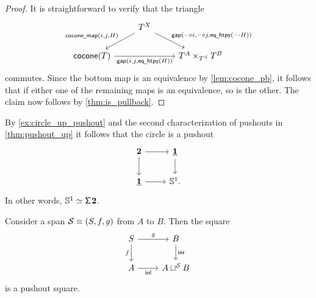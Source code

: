 \begin{proof}
It is straightforward to verify that the triangle
\begin{equation*}
\begin{tikzcd}
& T^X \arrow[dl,swap,"{\mathsf{cocone\usc{}map}(i,j,H)}"] \arrow[dr,"{\mathsf{gap}(\blank\circ i,\blank\circ j, \mathsf{eq\usc{}htpy}(\blank\cdot H))}"] \\
\mathsf{cocone}(T) \arrow[rr,swap,"{\mathsf{gap}(i,j,\mathsf{eq\usc{}htpy}(H))}"] & & T^A \times_{T^S} T^B
\end{tikzcd}
\end{equation*}
commutes. Since the bottom map is an equivalence by \cref{lem:cocone_pb}, it follows that if either one of the remaining maps is an equivalence, so is the other. The claim now follows by \cref{thm:is_pullback}.
\end{proof}

\begin{eg}\label{eg:circle_pushout}
By \autoref{ex:circle_up_pushout} and the second characterization of pushouts in \autoref{thm:pushout_up} it follows that the circle is a pushout
\begin{equation*}
\begin{tikzcd}
\bool \arrow[r] \arrow[d] & \unit \arrow[d] \\
\unit \arrow[r] & \sphere{1}.
\end{tikzcd}
\end{equation*}
In other words, $\eqv{\sphere{1}}{\susp{\bool}}$. 
\end{eg}

\begin{thm}\label{thm:pushout}
Consider a span $\mathcal{S}\equiv (S,f,g)$ from $A$ to $B$. Then the square
\begin{equation*}
\begin{tikzcd}
S \arrow[r,"g"] \arrow[d,swap,"f"] & B \arrow[d,"\inr"] \\
A \arrow[r,swap,"\inl"] & A \sqcup^{\mathcal{S}} B
\end{tikzcd}
\end{equation*}
is a pushout square.
\end{thm}

